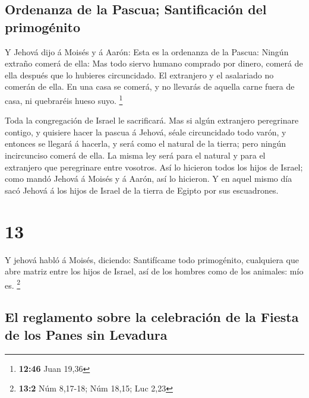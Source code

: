 \hypertarget{ordenanza-de-la-pascua-santificaciuxf3n-del-primoguxe9nito}{%
\subsection{Ordenanza de la Pascua; Santificación del
primogénito}\label{ordenanza-de-la-pascua-santificaciuxf3n-del-primoguxe9nito}}

 Y Jehová dijo á Moisés y á Aarón: Esta es la ordenanza de
la Pascua: Ningún extraño comerá de ella:  Mas todo siervo
humano comprado por dinero, comerá de ella después que lo hubieres
circuncidado.  El extranjero y el asalariado no comerán de
ella.  En una casa se comerá, y no llevarás de aquella
carne fuera de casa, ni quebraréis hueso suyo. \footnote{\textbf{12:46}
  Juan 19,36}

 Toda la congregación de Israel le sacrificará.
 Mas si algún extranjero peregrinare contigo, y quisiere
hacer la pascua á Jehová, séale circuncidado todo varón, y entonces se
llegará á hacerla, y será como el natural de la tierra; pero ningún
incircunciso comerá de ella.  La misma ley será para el
natural y para el extranjero que peregrinare entre vosotros.
 Así lo hicieron todos los hijos de Israel; como mandó
Jehová á Moisés y á Aarón, así lo hicieron.  Y en aquel
mismo día sacó Jehová á los hijos de Israel de la tierra de Egipto por
sus escuadrones.

\hypertarget{section-12}{%
\section{13}\label{section-12}}

 Y jehová habló á Moisés, diciendo:  Santifícame
todo primogénito, cualquiera que abre matriz entre los hijos de Israel,
así de los hombres como de los animales: mío es. \footnote{\textbf{13:2}
  Núm 8,17-18; Núm 18,15; Luc 2,23}

\hypertarget{el-reglamento-sobre-la-celebraciuxf3n-de-la-fiesta-de-los-panes-sin-levadura}{%
\subsection{El reglamento sobre la celebración de la Fiesta de los Panes
sin
Levadura}\label{el-reglamento-sobre-la-celebraciuxf3n-de-la-fiesta-de-los-panes-sin-levadura}}

